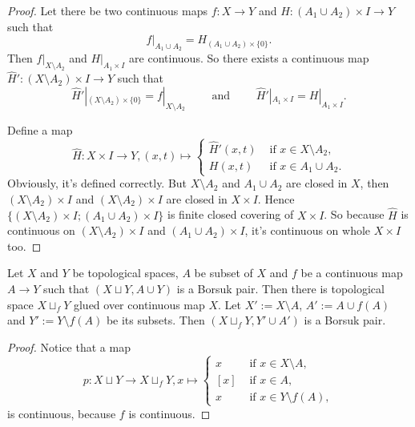 \documentclass[12pt,a4paper]{article}
\begin{document}
\begin{problem}{21}
        \begin{proof}
            Let there be two continuous maps $f: X \to Y$ and $H: (A_1 \cup A_2) \times I \to Y$ such that
            \[f|_{A_1 \cup A_2} = H_{(A_1 \cup A_2) \times \{0\}}.\]
            Then $f|_{X \setminus A_2}$ and $H|_{A_1 \times I}$ are continuous. So there exists a continuous map $\widehat{H}': (X \setminus A_2) \times I \to Y$ such that
            \[
                \widehat{H}'|_{(X \setminus A_2) \times \{0\}} = f|_{X \setminus A_2}
                \qquad \text{ and } \qquad
                \widehat{H}'|_{A_1 \times I} = H|_{A_1 \times I}.
            \]
            
            Define a map
            \[
                \widehat{H}: X \times I \to Y, (x, t) \mapsto
                \begin{cases}
                    \widehat{H}'(x, t)& \text{ if } x \in X \setminus A_2,\\
                    H(x, t)& \text{ if } x \in A_1 \cup A_2.
                \end{cases}
            \]
            Obviously, it's defined correctly. But $X \setminus A_2$ and $A_1 \cup A_2$ are closed in $X$, then $(X \setminus A_2) \times I$ and $(X \setminus A_2) \times I$ are closed in $X \times I$. Hence $\{(X \setminus A_2) \times I; (A_1 \cup A_2) \times I\}$ is finite closed covering of $X \times I$. So because $\widehat{H}$ is continuous on $(X \setminus A_2) \times I$ and $(A_1 \cup A_2) \times I$, it's continuous on whole $X \times I$ too.
        \end{proof}

        \begin{lemma}
            Let $X$ and $Y$ be topological spaces, $A$ be subset of $X$ and $f$ be a continuous map $A \to Y$ such that $(X \sqcup Y, A \cup Y)$ is a Borsuk pair. Then there is topological space $X \sqcup_f Y$ glued over continuous map $X$. Let $X' := X \setminus A$, $A' := A \cup f(A)$ and $Y' := Y \setminus f(A)$ be its subsets. Then $(X \sqcup_f Y, Y' \cup A')$ is a Borsuk pair.
        \end{lemma}

        \begin{proof}
            Notice that a map
            \[
                p: X \sqcup Y \to X \sqcup_f Y, x \mapsto
                \begin{cases}
                    x& \text{ if } x \in X \setminus A,\\
                    [x]& \text{ if } x \in A,\\
                    x& \text{ if } x \in Y \setminus f(A),
                \end{cases}
            \]
            is continuous, because $f$ is continuous.


\end{proof}
\end{problem}
\end{document}
